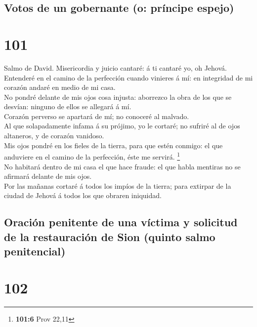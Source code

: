 \hypertarget{votos-de-un-gobernante-o-pruxedncipe-espejo}{%
\subsection{Votos de un gobernante (o: príncipe
espejo)}\label{votos-de-un-gobernante-o-pruxedncipe-espejo}}

\hypertarget{section-100}{%
\section{101}\label{section-100}}

 Salmo de David. Misericordia y juicio cantaré: á ti cantaré
yo, oh Jehová.\\
 Entenderé en el camino de la perfección cuando vinieres á
mí: en integridad de mi corazón andaré en medio de mi casa.\\
 No pondré delante de mis ojos cosa injusta: aborrezco la
obra de los que se desvían: ninguno de ellos se allegará á mí.\\
 Corazón perverso se apartará de mí; no conoceré al
malvado.\\
 Al que solapadamente infama á su prójimo, yo le cortaré; no
sufriré al de ojos altaneros, y de corazón vanidoso.\\
 Mis ojos pondré en los fieles de la tierra, para que estén
conmigo: el que anduviere en el camino de la perfección, éste me
servirá. \footnote{\textbf{101:6} Prov 22,11}\\
 No habitará dentro de mi casa el que hace fraude: el que
habla mentiras no se afirmará delante de mis ojos.\\
 Por las mañanas cortaré á todos los impíos de la tierra;
para extirpar de la ciudad de Jehová á todos los que obraren iniquidad.

\hypertarget{oraciuxf3n-penitente-de-una-vuxedctima-y-solicitud-de-la-restauraciuxf3n-de-sion-quinto-salmo-penitencial}{%
\subsection{Oración penitente de una víctima y solicitud de la
restauración de Sion (quinto salmo
penitencial)}\label{oraciuxf3n-penitente-de-una-vuxedctima-y-solicitud-de-la-restauraciuxf3n-de-sion-quinto-salmo-penitencial}}

\hypertarget{section-101}{%
\section{102}\label{section-101}}

